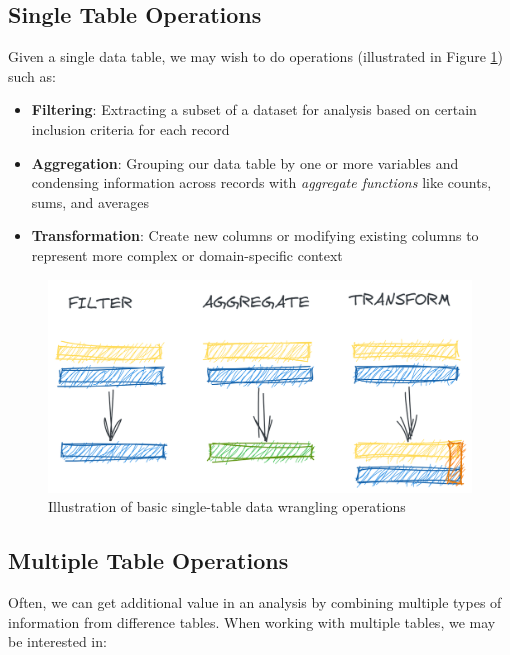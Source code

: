 \documentclass[
]{krantz}
\providecommand{\tightlist}{%
  \setlength{\itemsep}{0pt}\setlength{\parskip}{0pt}}
\begin{document}
\hypertarget{single-table-operations}{%
\subsection{Single Table Operations}\label{single-table-operations}}

Given a single data table, we may wish to do operations (illustrated in Figure \ref{fig:filt-aggr-tran}) such as:

\begin{itemize}
\tightlist
\item
  \textbf{Filtering}: Extracting a subset of a dataset for analysis based on certain inclusion criteria for each record
\item
  \textbf{Aggregation}: Grouping our data table by one or more variables and condensing information across records with \emph{aggregate functions} like counts, sums, and averages
\item
  \textbf{Transformation}: Create new columns or modifying existing columns to represent more complex or domain-specific context
\end{itemize}

\begin{figure}

{\centering \includegraphics[width=0.9\linewidth]{figures/comp-quan/filt-aggr-tran} 

}

\caption{Illustration of basic single-table data wrangling operations}\label{fig:filt-aggr-tran}
\end{figure}

\hypertarget{multiple-table-operations}{%
\subsection{Multiple Table Operations}\label{multiple-table-operations}}

Often, we can get additional value in an analysis by combining multiple types of information from difference tables.
When working with multiple tables, we may be interested in:
\end{document}
